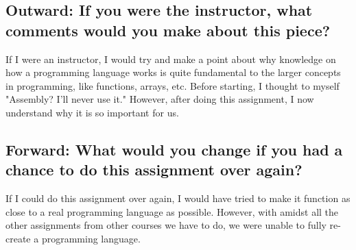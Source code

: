 \documentclass[12pt]{article}
\begin{document}
\subsection*{Outward: If you were the instructor, what comments would you make about this piece?}
If I were an instructor, I would try and make a point about why knowledge on how a programming language works is quite fundamental to the larger concepts in programming, like functions, arrays, etc. Before starting, I thought to myself "Assembly? I'll never use it." However, after doing this assignment, I now understand why it is so important for us.

\subsection*{Forward: What would you change if you had a chance to do this assignment over again?}
If I could do this assignment over again, I would have tried to make it function as close to a real programming language as possible. However, with amidst all the other assignments from other courses we have to do, we were unable to fully re-create a programming language. 
\end{document}
